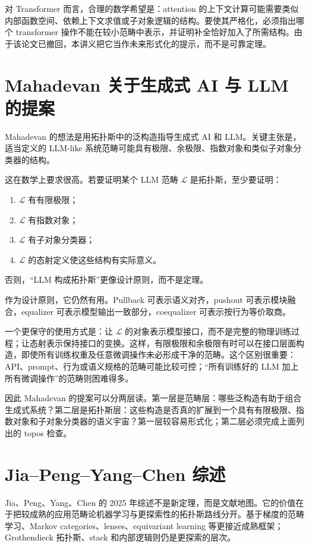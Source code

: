 \documentclass[UTF8,11pt,fontset=none]{ctexart}
\begin{document}
对 Transformer 而言，合理的数学希望是：attention 的上下文计算可能需要类似内部函数空间、依赖上下文求值或子对象逻辑的结构。要使其严格化，必须指出哪个 transformer 操作不能在较小范畴中表示，并证明补全恰好加入了所需结构。由于该论文已撤回，本讲义把它当作未来形式化的提示，而不是可靠定理。

\section{Mahadevan 关于生成式 AI 与 LLM 的提案}

Mahadevan 的想法是用拓扑斯中的泛构造指导生成式 AI 和 LLM。关键主张是，适当定义的 LLM-like 系统范畴可能具有极限、余极限、指数对象和类似子对象分类器的结构。

这在数学上要求很高。若要证明某个 LLM 范畴 \(\mathcal L\) 是拓扑斯，至少要证明：
\begin{enumerate}
\item \(\mathcal L\) 有有限极限；
\item \(\mathcal L\) 有指数对象；
\item \(\mathcal L\) 有子对象分类器；
\item \(\mathcal L\) 的态射定义使这些结构有实际意义。
\end{enumerate}
否则，“LLM 构成拓扑斯”更像设计原则，而不是定理。

作为设计原则，它仍然有用。Pullback 可表示语义对齐，pushout 可表示模块融合，equalizer 可表示模型输出一致部分，coequalizer 可表示按行为等价取商。

一个更保守的使用方式是：让 \(\mathcal L\) 的对象表示模型接口，而不是完整的物理训练过程；让态射表示保持接口的变换。这样，有限极限和余极限有时可以在接口层面构造，即使所有训练权重及任意微调操作未必形成干净的范畴。这个区别很重要：API、prompt、行为或语义规格的范畴可能比较可控；“所有训练好的 LLM 加上所有微调操作”的范畴则困难得多。

因此 Mahadevan 的提案可以分两层读。第一层是范畴层：哪些泛构造有助于组合生成式系统？第二层是拓扑斯层：这些构造是否真的扩展到一个具有有限极限、指数对象和子对象分类器的语义宇宙？第一层较容易形式化；第二层必须完成上面列出的 topos 检查。

\section{Jia--Peng--Yang--Chen 综述}

Jia、Peng、Yang、Chen 的 2025 年综述不是新定理，而是文献地图。它的价值在于把较成熟的应用范畴论机器学习与更探索性的拓扑斯路线分开。基于梯度的范畴学习、Markov categories、lenses、equivariant learning 等更接近成熟框架；Grothendieck 拓扑斯、stack 和内部逻辑则仍是更探索的层次。
\end{document}
